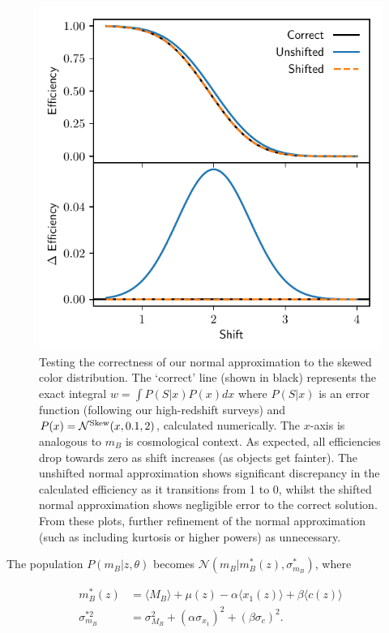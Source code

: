\documentclass[a4paper,fleqn,usenatbib]{mnras}
\begin{document}
\begin{figure}
	\begin{center}
		\includegraphics[width=\columnwidth]{shift.pdf}
	\end{center}
	\caption{Testing the correctness of our normal approximation to the skewed color distribution. The `correct' line (shown in black) represents the exact integral $w = \int P(S|x) P(x) dx$ where $P(S|x)$ is an error function (following our high-redshift surveys) and $P(x) = \mathcal{N}^{\rm Skew}(x, 0.1, 2)$, calculated numerically. The $x$-axis is analogous to $m_B$ is cosmological context. As expected, all efficiencies drop towards zero as shift increases (as objects get fainter). The unshifted normal approximation shows significant discrepancy in the calculated efficiency as it transitions from 1 to 0, whilst the shifted normal approximation shows negligible error to the correct solution. From these plots, further refinement of the normal approximation (such as including kurtosis or higher powers) as unnecessary.}
	\label{fig:shift}
\end{figure}



The population $P(m_B | z, \theta)$ becomes $\mathcal{N}(m_B|m_B^*(z), \sigma^*_{m_B})$, where

\begin{align}
m_B^*(z) &= \langle M_B \rangle + \mu(z) - \alpha \langle x_1(z) \rangle + \beta \langle c(z) \rangle \\
\sigma^{*2}_{m_B} &= \sigma_{M_B}^2 + (\alpha \sigma_{x_1})^2 + (\beta \sigma_c)^2.
\end{align}
\end{document}

